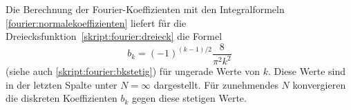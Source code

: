 Die Berechnung der Fourier-Koeffizienten mit den Integralformeln
\eqref{fourier:normalekoeffizienten}
liefert für die Dreiecksfunktion~\eqref{skript:fourier:dreieck}
die Formel
\[
b_k = (-1)^{(k-1)/2}\frac{8}{\pi^2k^2}
\]
(siehe auch \eqref{skript:fourier:bkstetig})
für ungerade Werte von $k$.
Diese Werte sind in der letzten Spalte unter $N=\infty$ dargestellt.
Für zunehmendes $N$ konvergieren die diskreten Koeffizienten $b_k$ gegen 
diese stetigen Werte.

